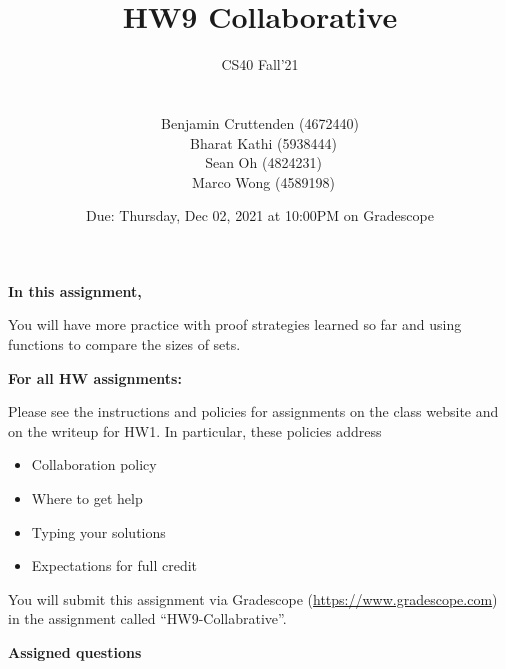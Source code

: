 \documentclass[12pt, oneside]{article}
\title{HW9 Collaborative}
\author{CS40 Fall'21\\\\\\
Benjamin Cruttenden (4672440)\\\
Bharat Kathi (5938444)\\\
Sean Oh (4824231)\\\
Marco Wong (4589198)}
\date{Due: Thursday, Dec 02, 2021 at 10:00PM on Gradescope}
\begin{document}
\maketitle

{\bf In this assignment,}

You will have more practice with proof strategies learned so far and using functions to compare the sizes of sets.


{\bf For all HW assignments:}

Please see the instructions and policies for assignments on the class website and on the writeup for HW1.  In particular, these policies address
\begin{multicols}{2}
\begin{itemize}
\item Collaboration policy
\item Where to get help
\item Typing your solutions
\item Expectations for full credit
\end{itemize}
\end{multicols}


You will submit this assignment via Gradescope
(\href{https://www.gradescope.com}{https://www.gradescope.com}) in the assignment called ``HW9-Collabrative''.

\newpage

{\bf Assigned questions}
\end{document}
